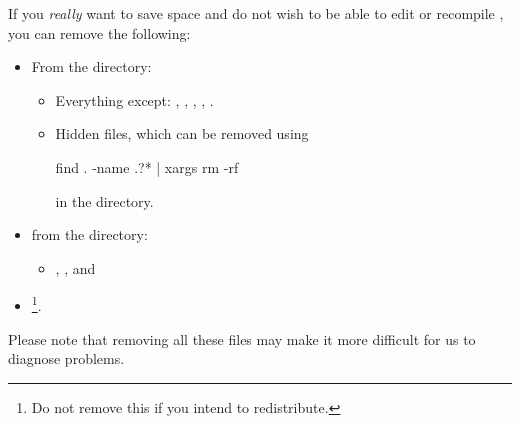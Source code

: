 If you \emph{really} want to save space and do not wish to be able to edit or recompile \esfinley, you can remove the following:
\begin{itemize}
 \item From the  directory:\begin{itemize}
\item Everything except: , , , ,
.
\item Hidden files, which can be removed using
\begin{shellCode}
find . -name .?* | xargs rm -rf
\end{shellCode}
in the  directory.
\end{itemize}
\item from the  directory:
\begin{itemize}
\item  {}, ,  and 
\end{itemize}
\item {}\footnote{Do not remove this if you intend to redistribute.}.
\end{itemize}

Please note that removing all these files may make it more difficult for us to diagnose problems.


